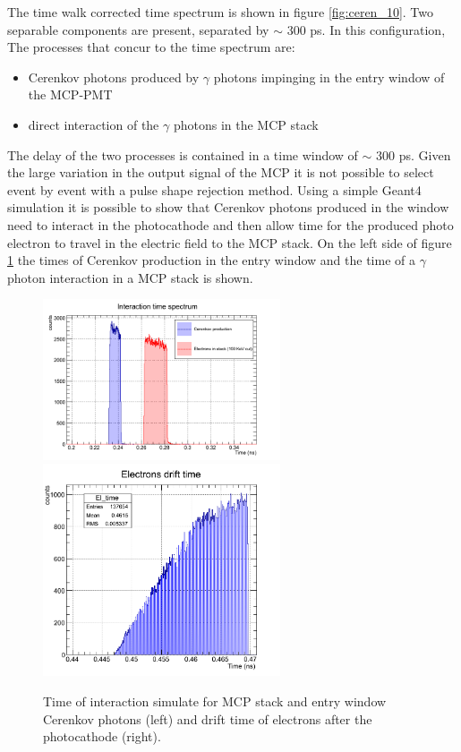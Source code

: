 The time walk corrected time spectrum is shown in figure \ref{fig:ceren_10}. Two separable components are present, separated by $\sim$ 300 ps. %
In this configuration, The processes that concur to the time spectrum are:
\begin{itemize}
\item Cerenkov photons produced by $\gamma$ photons impinging in the entry window of the MCP-PMT
\item direct interaction of the $\gamma$ photons in the MCP stack
\end{itemize}
The delay of the two processes is contained in a time window of $\sim$ 300 ps.
Given the large variation in the output signal of the MCP it is not possible to select event by event with a pulse shape rejection method.
Using a simple Geant4 simulation it is possible to show that Cerenkov photons produced in the window need to interact in the photocathode and then allow time for the produced photo electron to travel in the electric field to the MCP stack. On the left side of figure \ref{fig:drift} the times of Cerenkov production in the entry window and the time of a $\gamma$ photon interaction in a MCP stack is shown.
\begin{figure}[htbp]
\begin{center}
\includegraphics[width=7cm]{../Pictures/Chapter_8/interaction_time_spectrum.png}
\includegraphics[width=7cm]{../Pictures/Chapter_8/electron_drift.png}
\end{center}
\caption[Stack and Cerenkov simulation]{Time of interaction simulate for MCP stack and entry window Cerenkov photons (left) and drift time of electrons after the photocathode (right). }
\label{fig:drift}
\end{figure}
